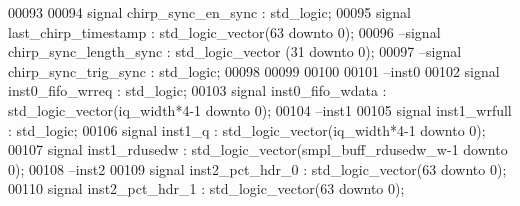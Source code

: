 \begin{DoxyCode}
00093 
00094 \textcolor{keywordflow}{signal} \textcolor{vhdlchar}{chirp_sync_en_sync}       \textcolor{vhdlchar}{:} \textcolor{comment}{std\_logic};
00095 \textcolor{keywordflow}{signal} \textcolor{vhdlchar}{last_chirp_timestamp} \textcolor{vhdlchar}{:} \textcolor{comment}{std\_logic\_vector}\textcolor{vhdlchar}{(}\textcolor{vhdllogic}{}\textcolor{vhdllogic}{63} \textcolor{keywordflow}{downto} \textcolor{vhdllogic}{}\textcolor{vhdllogic}{0}\textcolor{vhdlchar}{)};
00096 \textcolor{keyword}{--signal chirp\_sync\_length\_sync : std\_logic\_vector (31 downto 0);}
00097 \textcolor{keyword}{--signal chirp\_sync\_trig\_sync   : std\_logic;}
00098 
00099 
00100 
00101 \textcolor{keyword}{--inst0 }
00102 \textcolor{keywordflow}{signal} \textcolor{vhdlchar}{inst0_fifo_wrreq}       \textcolor{vhdlchar}{:} \textcolor{comment}{std\_logic};
00103 \textcolor{keywordflow}{signal} \textcolor{vhdlchar}{inst0_fifo_wdata}       \textcolor{vhdlchar}{:} \textcolor{comment}{std\_logic\_vector}\textcolor{vhdlchar}{(}\textcolor{vhdlchar}{iq_width}\textcolor{vhdlchar}{*}\textcolor{vhdllogic}{4-1} \textcolor{keywordflow}{downto} \textcolor{vhdllogic}{}\textcolor{vhdllogic}{0}\textcolor{vhdlchar}{)};
00104 \textcolor{keyword}{--inst1}
00105 \textcolor{keywordflow}{signal} \textcolor{vhdlchar}{inst1_wrfull}           \textcolor{vhdlchar}{:} \textcolor{comment}{std\_logic};
00106 \textcolor{keywordflow}{signal} \textcolor{vhdlchar}{inst1_q}                \textcolor{vhdlchar}{:} \textcolor{comment}{std\_logic\_vector}\textcolor{vhdlchar}{(}\textcolor{vhdlchar}{iq_width}\textcolor{vhdlchar}{*}\textcolor{vhdllogic}{4-1} \textcolor{keywordflow}{downto} \textcolor{vhdllogic}{}\textcolor{vhdllogic}{0}\textcolor{vhdlchar}{)};
00107 \textcolor{keywordflow}{signal} \textcolor{vhdlchar}{inst1_rdusedw}          \textcolor{vhdlchar}{:} \textcolor{comment}{std\_logic\_vector}\textcolor{vhdlchar}{(}\textcolor{vhdlchar}{smpl_buff_rdusedw_w}\textcolor{vhdlchar}{-}\textcolor{vhdllogic}{}\textcolor{vhdllogic}{1} \textcolor{keywordflow}{downto} \textcolor{vhdllogic}{}\textcolor{vhdllogic}{0}\textcolor{vhdlchar}{)};
00108 \textcolor{keyword}{--inst2}
00109 \textcolor{keywordflow}{signal} \textcolor{vhdlchar}{inst2_pct_hdr_0}        \textcolor{vhdlchar}{:} \textcolor{comment}{std\_logic\_vector}\textcolor{vhdlchar}{(}\textcolor{vhdllogic}{}\textcolor{vhdllogic}{63} \textcolor{keywordflow}{downto} \textcolor{vhdllogic}{}\textcolor{vhdllogic}{0}\textcolor{vhdlchar}{)};
00110 \textcolor{keywordflow}{signal} \textcolor{vhdlchar}{inst2_pct_hdr_1}        \textcolor{vhdlchar}{:} \textcolor{comment}{std\_logic\_vector}\textcolor{vhdlchar}{(}\textcolor{vhdllogic}{}\textcolor{vhdllogic}{63} \textcolor{keywordflow}{downto} \textcolor{vhdllogic}{}\textcolor{vhdllogic}{0}\textcolor{vhdlchar}{)};

\end{DoxyCode}
